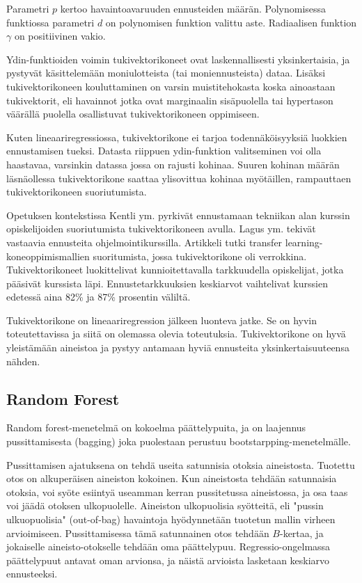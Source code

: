 \documentclass[finnish,twoside,openright]{HYgraduMLDS}
\begin{document}
Parametri $p$ kertoo havaintoavaruuden ennusteiden määrän. Polynomisessa funktiossa parametri $d$ on polynomisen funktion valittu aste. Radiaalisen funktion $\gamma$ on positiivinen vakio.

Ydin-funktioiden voimin tukivektorikoneet ovat laskennallisesti yksinkertaisia, ja pystyvät käsittelemään moniulotteista (tai moniennusteista) dataa. Lisäksi tukivektorikoneen kouluttaminen on varsin muistitehokasta koska ainoastaan tukivektorit, eli havainnot jotka ovat marginaalin sisäpuolella tai hypertason väärällä puolella osallistuvat tukivektorikoneen oppimiseen. 

Kuten lineaariregressiossa, tukivektorikone ei tarjoa todennäköisyyksiä luokkien ennustamisen tueksi. Datasta riippuen ydin-funktion valitseminen voi olla haastavaa, varsinkin datassa jossa on rajusti kohinaa. Suuren kohinan määrän läsnäollessa tukivektorikone saattaa ylisovittua kohinaa myötäillen, rampauttaen tukivektorikoneen suoriutumista.

Opetuksen kontekstissa Kentli ym. \cite{kentli2011svm} pyrkivät ennustamaan tekniikan alan kurssin opiskelijoiden suoriutumista tukivektorikoneen avulla. Lagus ym. \cite{lagus2018transfer} tekivät vastaavia ennusteita ohjelmointikurssilla. Artikkeli\cite{lagus2018transfer} tutki transfer learning-koneoppimismallien suoritumista, jossa tukivektorikone oli verrokkina. Tukivektorikoneet luokittelivat kunnioitettavalla tarkkuudella opiskelijat, jotka pääsivät kurssista läpi. Ennustetarkkuuksien keskiarvot vaihtelivat kurssien edetessä aina 82\% ja 87\% prosentin väliltä.

Tukivektorikone on lineaariregression jälkeen luonteva jatke. Se on hyvin toteutettavissa ja siitä on olemassa olevia toteutuksia. Tukivektorikone on hyvä yleistämään aineistoa ja pystyy antamaan hyviä ennusteita yksinkertaisuuteensa nähden.


\subsection{Random Forest}

Random forest-menetelmä on kokoelma päättelypuita, ja on laajennus pussittamisesta (bagging)\cite{james2013ISLR} joka puolestaan perustuu bootstarpping-menetelmälle. 

Pussittamisen ajatuksena on tehdä useita satunnisia otoksia aineistosta. Tuotettu otos on alkuperäisen aineiston kokoinen. Kun aineistosta tehdään satunnaisia otoksia, voi syöte esiintyä useamman kerran pussitetussa aineistossa, ja osa taas voi jäädä otoksen ulkopuolelle. Aineiston ulkopuolisia syötteitä, eli "pussin ulkuopuolisia"  (out-of-bag) havaintoja hyödynnetään tuotetun mallin virheen arvioimiseen. Pussittamisessa tämä satunnainen otos tehdään $B$-kertaa, ja jokaiselle aineisto-otokselle tehdään oma päättelypuu. Regressio-ongelmassa päättelypuut antavat oman arvionsa, ja näistä arvioista lasketaan keskiarvo ennusteeksi.
\end{document}
